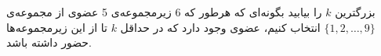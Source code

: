 بزرگترین $k$ را بیابید بگونه‌ای که هرطور که 6 زیرمجموعه‌ی 5 عضوی از مجموعه‌ی $\{1, 2, \dots, 9\}$ انتخاب کنیم، عضوی وجود دارد که در حداقل $k$ تا از این زیرمجموعه‌ها حضور داشته باشد.